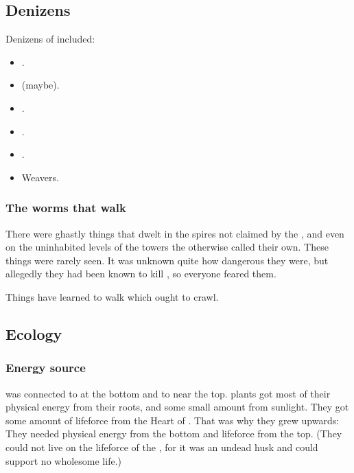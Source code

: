 \subsection{Denizens}
Denizens of \Nyx included:
\begin{itemize}
  \item \Flyingpolyps.
  \item \Noggyaleth (maybe).
  \item \Ophanim. 
  \item \Resphain. 
  \item \Umbrae.
  \item Weavers.
\end{itemize}





\subsubsection{The worms that walk}
There were ghastly things that dwelt in the spires not claimed by the \resphain, and even on the uninhabited levels of the towers the \resphain otherwise called their own.
These things were rarely seen. 
It was unknown quite how dangerous they were, but allegedly they had been known to kill \resphain, so everyone feared them. 

Things have learned to walk which ought to crawl. 










\subsection{Ecology}





\subsubsection{Energy source}
\Nyx was connected to \Erebos at the bottom and to \Miith near the top.
\Nyxian plants got most of their physical energy from their roots, and some small amount from sunlight. 
They got some amount of lifeforce from the Heart of \Miith. 
That was why they grew upwards: 
They needed physical energy from the bottom and lifeforce from the top. 
(They could not live on the lifeforce of the , for it was an undead husk and could support no wholesome life.)





